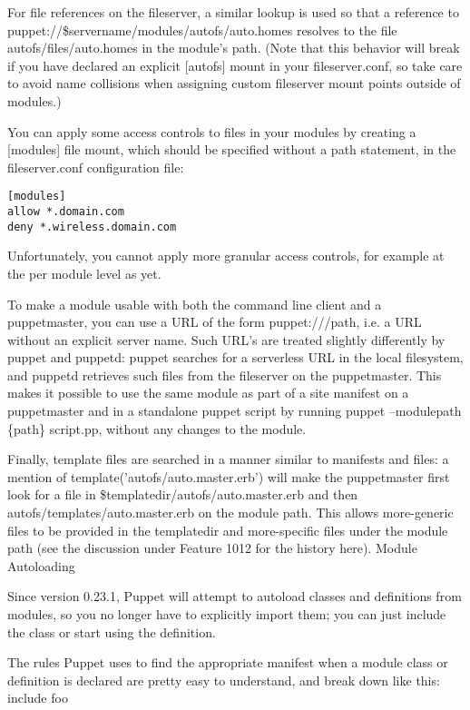 For file references on the fileserver, a similar lookup is used so that a reference to puppet://\$servername/modules/autofs/auto.homes resolves to the file autofs/files/auto.homes in the module's path. (Note that this behavior will break if you have declared an explicit [autofs] mount in your fileserver.conf, so take care to avoid name collisions when assigning custom fileserver mount points outside of modules.)

You can apply some access controls to files in your modules by creating a [modules] file mount, which should be specified without a path statement, in the fileserver.conf configuration file:
%
\begin{code}
\begin{lstlisting}
[modules]
allow *.domain.com
deny *.wireless.domain.com
\end{lstlisting}
\end{code}
%
Unfortunately, you cannot apply more granular access controls, for example at the per module level as yet.

To make a module usable with both the command line client and a puppetmaster, you can use a URL of the form puppet:///path, i.e. a URL without an explicit server name. Such URL's are treated slightly differently by puppet and puppetd: puppet searches for a serverless URL in the local filesystem, and puppetd retrieves such files from the fileserver on the puppetmaster. This makes it possible to use the same module as part of a site manifest on a puppetmaster and in a standalone puppet script by running puppet --modulepath \{path\} script.pp, without any changes to the module.

Finally, template files are searched in a manner similar to manifests and files: a mention of template('autofs/auto.master.erb') will make the puppetmaster first look for a file in \$templatedir/autofs/auto.master.erb and then autofs/templates/auto.master.erb on the module path. This allows more-generic files to be provided in the templatedir and more-specific files under the module path (see the discussion under Feature 1012 for the history here).
Module Autoloading

Since version 0.23.1, Puppet will attempt to autoload classes and definitions from modules, so you no longer have to explicitly import them; you can just include the class or start using the definition.

The rules Puppet uses to find the appropriate manifest when a module class or definition is declared are pretty easy to understand, and break down like this:
include foo 	

